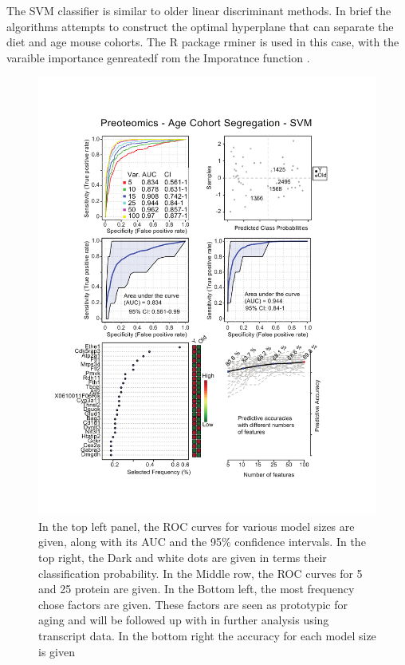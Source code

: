 \documentclass[a4paper,11pt,twoside]{book}
\begin{document}
	The SVM classifier is similar to older linear discriminant methods. In brief the algorithms attempts to construct the optimal hyperplane that can separate the diet and age mouse cohorts\citep{Shawe-Taylor2011SVM}. The R package rminer is used in this case, with the varaible importance genreatedf rom the Imporatnce function \citep{Cortez2016}.
	
	\begin{figure}[htb!]
		\centering
		\includegraphics[width=1.1\linewidth]{"3.Proteomics/Proteomics_Vingette_SVM_Age"}
        \caption[SVM Classifier for Young and Old Mice using Proteins]{In the top left panel, the ROC curves for various model sizes are given, along with its AUC and the 95\% confidence intervals. In the top right, the Dark and white dots are given in terms their classification probability. In the Middle row, the ROC curves for 5 and 25 protein are given. In the Bottom left, the most frequency chose factors are given. These factors are seen as prototypic for aging and will be followed up with in further analysis using transcript data. In the bottom right the accuracy for each model size is given} 
		\label{fig:proteomicsvingettesvm}
	\end{figure}
	
\end{document}
